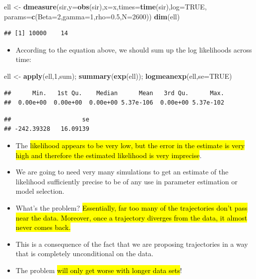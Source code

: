 \documentclass[]{article}
\newenvironment{Shaded}{\begin{snugshade}}{\end{snugshade}}
\newcommand{\KeywordTok}[1]{\textcolor[rgb]{0.13,0.29,0.53}{\textbf{#1}}}
\newcommand{\DataTypeTok}[1]{\textcolor[rgb]{0.13,0.29,0.53}{#1}}
\newcommand{\DecValTok}[1]{\textcolor[rgb]{0.00,0.00,0.81}{#1}}
\newcommand{\FloatTok}[1]{\textcolor[rgb]{0.00,0.00,0.81}{#1}}
\newcommand{\StringTok}[1]{\textcolor[rgb]{0.31,0.60,0.02}{#1}}
\newcommand{\OtherTok}[1]{\textcolor[rgb]{0.56,0.35,0.01}{#1}}
\newcommand{\NormalTok}[1]{#1}
\providecommand{\tightlist}{%
  \setlength{\itemsep}{0pt}\setlength{\parskip}{0pt}}
\begin{document}
\begin{Shaded}
\begin{Highlighting}[]
\NormalTok{ell <-}\StringTok{ }\KeywordTok{dmeasure}\NormalTok{(sir,}\DataTypeTok{y=}\KeywordTok{obs}\NormalTok{(sir),}\DataTypeTok{x=}\NormalTok{x,}\DataTypeTok{times=}\KeywordTok{time}\NormalTok{(sir),}\DataTypeTok{log=}\OtherTok{TRUE}\NormalTok{,}
                \DataTypeTok{params=}\KeywordTok{c}\NormalTok{(}\DataTypeTok{Beta=}\DecValTok{2}\NormalTok{,}\DataTypeTok{gamma=}\DecValTok{1}\NormalTok{,}\DataTypeTok{rho=}\FloatTok{0.5}\NormalTok{,}\DataTypeTok{N=}\DecValTok{2600}\NormalTok{))}
\KeywordTok{dim}\NormalTok{(ell)}
\end{Highlighting}
\end{Shaded}

\begin{verbatim}
## [1] 10000    14
\end{verbatim}

\begin{itemize}
\tightlist
\item
  According to the equation above, we should sum up the log likelihoods
  across time:
\end{itemize}

\begin{Shaded}
\begin{Highlighting}[]
\NormalTok{ell <-}\StringTok{ }\KeywordTok{apply}\NormalTok{(ell,}\DecValTok{1}\NormalTok{,sum); }\KeywordTok{summary}\NormalTok{(}\KeywordTok{exp}\NormalTok{(ell)); }\KeywordTok{logmeanexp}\NormalTok{(ell,}\DataTypeTok{se=}\OtherTok{TRUE}\NormalTok{)}
\end{Highlighting}
\end{Shaded}

\begin{verbatim}
##      Min.   1st Qu.    Median      Mean   3rd Qu.      Max. 
##  0.00e+00  0.00e+00  0.00e+00 5.37e-106  0.00e+00 5.37e-102
\end{verbatim}

\begin{verbatim}
##                    se 
## -242.39328   16.09139
\end{verbatim}

\begin{itemize}
\item
  The \hl{likelihood appears to be very low, but the error in the estimate
  is very high and therefore the estimated likelihood is very imprecise}.
\item
  We are going to need very many simulations to get an estimate of the
  likelihood sufficiently precise to be of any use in parameter
  estimation or model selection.
\item
  What's the problem? \hl{Essentially, far too many of the trajectories
  don't pass near the data. Moreover, once a trajectory diverges from
  the data, it almost never comes back.}
\item
  This is a consequence of the fact that we are proposing trajectories
  in a way that is completely unconditional on the data.
\item
  The problem \hl{will only get worse with longer data sets}!
\end{itemize}
\end{document}
